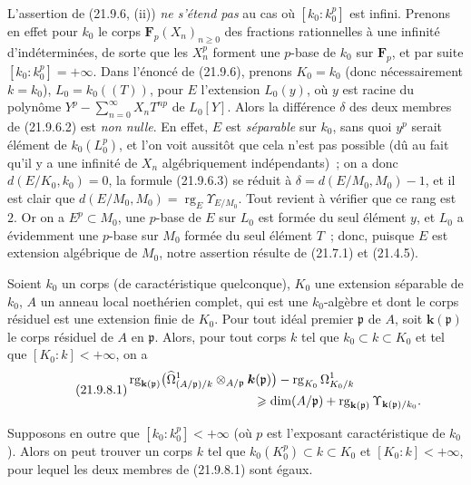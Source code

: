 \begin{remark}[21.9.7]
\label{0.21.9.7-fr}
L'assertion de (21.9.6, (ii)) \emph{ne s'étend pas} au cas où
$[k_0:k_0^p]$ est infini. Prenons en effet pour $k_0$ le corps
$\mathbf F_p(X_n)_{n\geqslant0}$ des fractions rationnelles à une infinité
d'indéterminées, de sorte que les $X_n^p$ forment une $p$-base de $k_0$ sur
$\mathbf F_p$, et par suite $[k_0:k_0^p]=+\infty$. Dans l'énoncé de (21.9.6),
prenons $K_0=k_0$ (donc nécessairement $k=k_0$), $L_0=k_0((T))$, pour $E$
l'extension $L_0(y)$, où $y$ est racine du polynôme $Y^p-\sum_{n=0}^{\infty}X_nT^{np}$
de $L_0[Y]$. Alors la différence $\delta$ des deux membres de (21.9.6.2) est
\emph{non nulle}. En effet, $E$ est \emph{séparable} sur $k_0$, sans quoi
$y^p$ serait élément de $k_0(L_0^p)$, et l'on voit aussitôt que cela n'est
pas possible (dû au fait qu'il y a une infinité de $X_n$ algébriquement
indépendants)~; on a donc $d(E/K_0,k_0)=0$, la formule (21.9.6.3) se réduit à
$\delta=d(E/M_0,M_0)-1$, et il est clair que
$d(E/M_0,M_0)=\operatorname{rg}_E\Upsilon_{E/M_0}$. Tout revient à vérifier
que ce rang est $2$. Or on a $E^p\subset M_0$, une $p$-base de $E$ sur $L_0$
est formée du seul élément $y$, et $L_0$ a évidemment une $p$-base sur $M_0$
formée du seul élément $T$~; donc, puisque $E$ est extension algébrique de
$M_0$, notre assertion résulte de (21.7.1) et (21.4.5).
\end{remark}

\begin{proposition}[21.9.8]
\label{0.21.9.8-fr}
Soient $k_0$ un corps (de caractéristique quelconque), $K_0$ une extension
séparable de $k_0$, $A$ un anneau local noethérien complet, qui est une
$k_0$-algèbre et dont le corps résiduel
est une extension finie de $K_0$. Pour tout idéal premier $\mathfrak p$ de
$A$, soit $\boldsymbol{k}(\mathfrak p)$ le corps résiduel de $A$ en $\mathfrak p$. Alors,
pour tout corps $k$ tel que $k_0\subset k\subset K_0$ et tel que
$[K_0:k]<+\infty$, on a
\begin{equation}
\tag{21.9.8.1}
\label{0.21.9.8.1-fr}
\begin{split}
  &\operatorname{rg}_{\mathbf{k}(\mathfrak p)}
    \bigl(\widehat\Omega^1_{(A/\mathfrak p)/k}
      \otimes_{A/\mathfrak p}\boldsymbol{k}(\mathfrak p)\bigr)
    -\operatorname{rg}_{K_0}\Omega^1_{K_0/k}\\
  &\hspace{35mm}\geqslant
    \dim(A/\mathfrak p)
    +\operatorname{rg}_{\mathbf{k}(\mathfrak p)}\Upsilon_{\mathbf{k}(\mathfrak p)/k_0}.
\end{split}
\end{equation}

Supposons en outre que $[k_0:k_0^p]<+\infty$ (où $p$ est l'exposant
caractéristique de $k_0$). Alors on peut trouver un corps $k$ tel que
$k_0(K_0^p)\subset k\subset K_0$ et $[K_0:k]<+\infty$, pour lequel les deux
membres de \textup{(21.9.8.1)} sont égaux.
\end{proposition}

